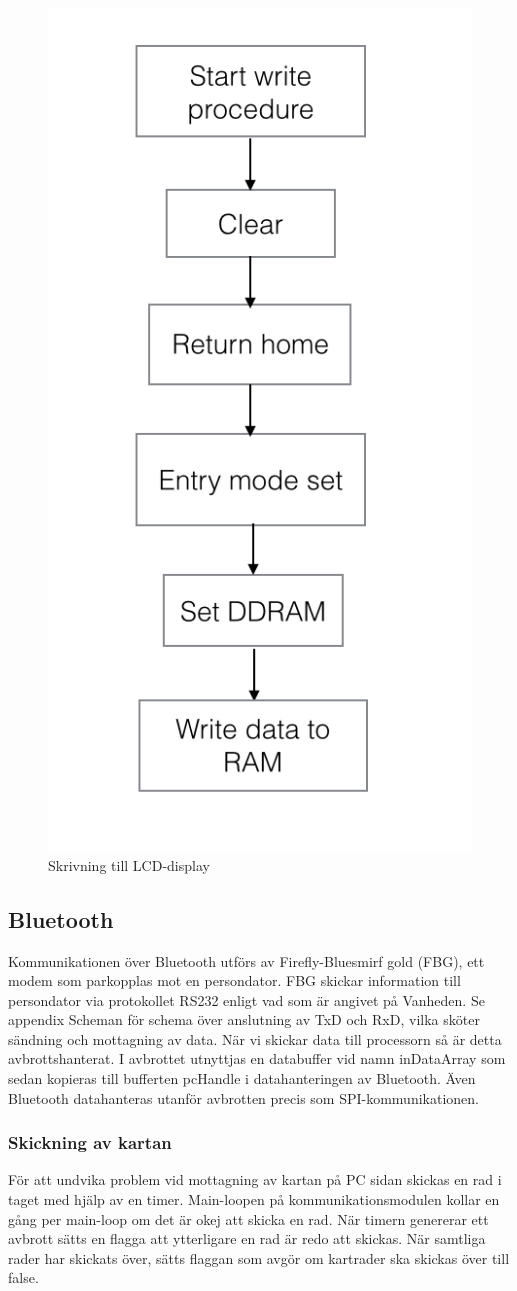 \documentclass[a4paper,12pt,fleqn]{article}
\begin{document}
\begin{figure}[htp] %
  \begin{center}
  \includegraphics[keepaspectratio=true,width=0.5\linewidth]{bilder/write}  %
  \end{center}
  \caption{Skrivning till LCD-display} %
  \label{fig:flowlcdwrite}
\end{figure}

\subsection{Bluetooth}
Kommunikationen över Bluetooth utförs av Firefly-Bluesmirf gold (FBG), ett modem som parkopplas mot en persondator.
FBG skickar information till persondator via protokollet RS232 enligt vad som är angivet på Vanheden. 
Se appendix Scheman för schema över anslutning av TxD och RxD, vilka sköter sändning och mottagning av data.
När vi skickar data till processorn så är detta avbrottshanterat. I avbrottet utnyttjas en databuffer vid namn inDataArray som sedan kopieras till bufferten pcHandle i datahanteringen av Bluetooth. Även Bluetooth datahanteras utanför avbrotten precis som SPI-kommunikationen.

\subsubsection{Skickning av kartan}
För att undvika problem vid mottagning av kartan på PC sidan skickas en rad i taget med hjälp av en timer. Main-loopen på kommunikationsmodulen kollar en gång per main-loop om det är okej att skicka en rad. När timern genererar ett avbrott sätts en flagga att ytterligare en rad är redo att skickas. När samtliga rader har skickats över, sätts flaggan som avgör om kartrader ska skickas över till false.
\end{document}
